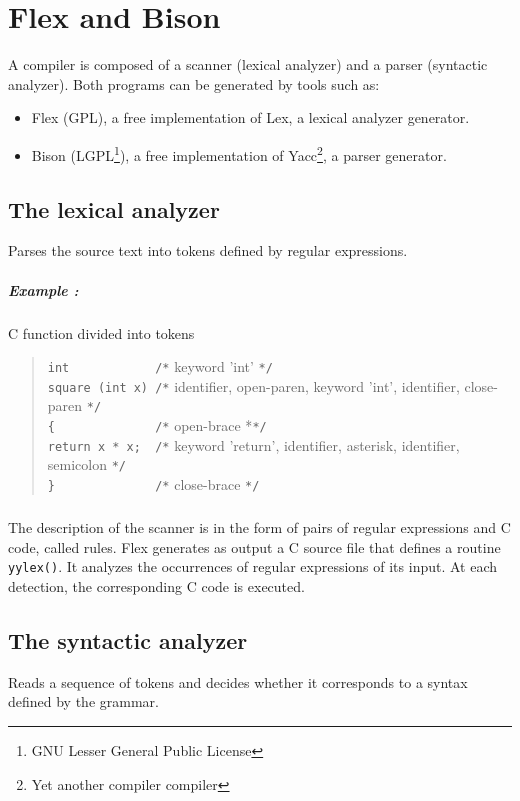 \chapter{Flex and Bison}
\label{bisonflex}

A compiler is composed of a scanner (lexical analyzer) and a parser (syntactic analyzer). Both programs can be generated by tools such as:
\begin {itemize}
 \item Flex (GPL), a free implementation of Lex, a lexical analyzer generator.
 \item Bison (LGPL\footnote{GNU Lesser General Public License}), a free implementation of Yacc\footnote{Yet another compiler compiler}, a parser generator.
\end {itemize}

\section{The lexical analyzer}
Parses the source text into tokens defined by regular expressions.

\paragraph{Example :} C function divided into tokens
\begin{quote}
\verb=int            /*= keyword 'int' \verb=*/= \\
\verb=square (int x) /*= identifier, open-paren, keyword 'int', identifier, close-paren \verb=*/= \\
\verb={              /*= open-brace *\verb=*/= \\
\verb=return x * x;  /*= keyword 'return', identifier, asterisk, identifier, semicolon \verb=*/= \\
\verb=}              /*= close-brace \verb=*/= 
\end{quote}

\paragraph{}
The description of the scanner is in the form of pairs of regular expressions and C code, called rules. Flex generates as output a C source file that defines a routine \texttt{yylex()}. It analyzes the occurrences of regular expressions of its input. At each detection, the corresponding C code is executed.


\section{The syntactic analyzer}
Reads a sequence of tokens and decides whether it corresponds to a syntax defined by the grammar.

